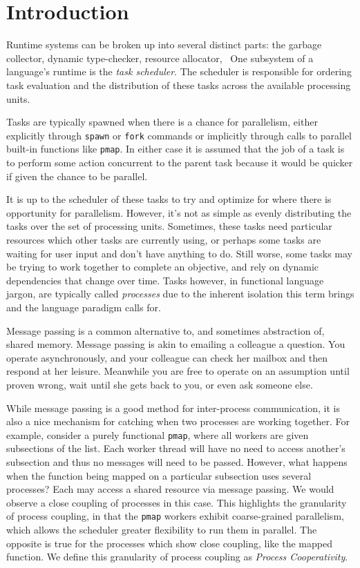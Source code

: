 \chapter{Introduction}
%
\label{chap:introduction}

Runtime systems can be broken up into several distinct parts: the garbage 
collector, dynamic type-checker, resource allocator, \etc~One 
subsystem of a language's runtime is the {\em task scheduler}. The scheduler is 
responsible for ordering task evaluation and the distribution of 
these tasks across the available processing units.

Tasks are typically spawned when there is a chance for parallelism, either 
explicitly through \texttt{spawn} or \texttt{fork} commands or implicitly 
through calls to parallel built-in functions like \texttt{pmap}. In either 
case it is assumed that the job of a task is to perform some action concurrent 
to the parent task because it would be quicker if given the chance to be 
parallel.

It is up to the scheduler of these tasks to try and optimize for where there
is opportunity for parallelism. However, it's not as simple as evenly 
distributing the tasks over the set of processing units. Sometimes, these 
tasks need particular resources which other tasks are currently using,
or perhaps some tasks are waiting for user input and don't have anything to
do. Still worse, some tasks may be trying to work together to complete an 
objective, and rely on dynamic dependencies that change over time.
Tasks however, in functional language jargon, are typically called 
{\em processes} due to the inherent isolation this term brings and the language 
paradigm calls for. 

Message passing is a common alternative to, and sometimes abstraction of, shared
memory. Message passing is akin to emailing a colleague a question. You operate
asynchronously, and your colleague can check her mailbox and then
respond at her leisure. Meanwhile you are free to operate on an assumption 
until proven wrong, wait until she gets back to you, or even ask someone else.

While message passing is a good method for inter-process communication, it is
also a nice mechanism for catching when two processes are working together.
For example, consider a purely functional \texttt{pmap}, where all 
workers are given subsections of the list. Each worker thread will have no
need to access another's subsection and thus no messages will need to be passed.
However, what happens when the function being mapped on a particular subsection uses 
several processes? Each may access a shared resource via message passing. 
We would observe a close coupling of processes in this case.
This highlights the granularity of process coupling, in that the \texttt{pmap}
workers exhibit coarse-grained parallelism, which allows the scheduler greater 
flexibility to run them in parallel. The opposite is true for the processes 
which show close coupling, like the mapped function. We define this granularity of process
coupling as {\em Process Cooperativity}.

